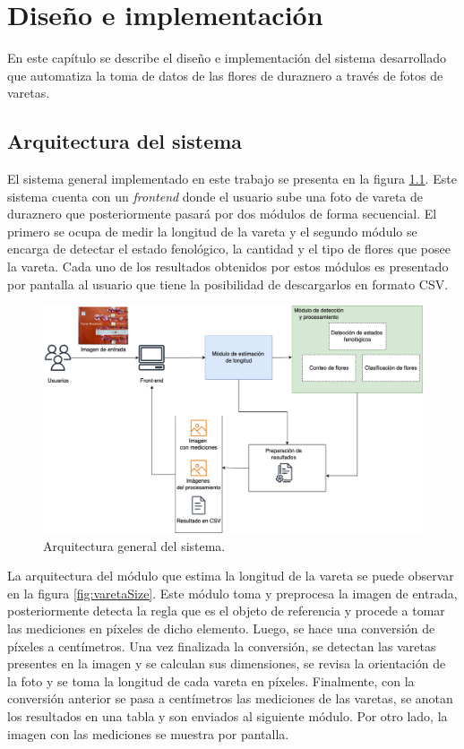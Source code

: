 \chapter{Diseño e implementación} %

\label{Chapter3} %

En este capítulo se describe el diseño e implementación del sistema desarrollado que automatiza la toma de datos de las flores de duraznero a través de fotos de varetas.

\section{Arquitectura del sistema}
\label{section3.1}

El sistema general implementado en este trabajo se presenta en la figura \ref{fig:sistemaGeneral}. Este sistema cuenta con un \textit{frontend} donde el usuario sube una foto de vareta de duraznero que posteriormente pasará por dos módulos de forma secuencial. El primero se ocupa de medir la longitud de la vareta y el segundo módulo se encarga de detectar el estado fenológico, la cantidad y el tipo de flores que posee la vareta. Cada uno de los resultados obtenidos por estos módulos es presentado por pantalla al usuario que tiene la posibilidad de descargarlos en formato CSV.

\begin{figure}[ht]
	\centering
	\includegraphics[scale=.35]{./Figures/arq1.drawio.png}
	\caption{Arquitectura general del sistema.}
	\label{fig:sistemaGeneral}
\end{figure}

La arquitectura del módulo que estima la longitud de la vareta se puede observar en la figura \ref{fig:varetaSize}. Este módulo toma y preprocesa la imagen de entrada, posteriormente detecta la regla que es el objeto de referencia y procede a tomar las mediciones en píxeles de dicho elemento. Luego, se hace una conversión de píxeles a centímetros. Una vez finalizada la conversión, se detectan las varetas presentes en la imagen y se calculan sus dimensiones, se revisa la orientación de la foto y se toma la longitud de cada vareta en píxeles. Finalmente, con la conversión anterior se pasa a centímetros las mediciones de las varetas, se anotan los resultados en una tabla y son enviados al siguiente módulo. Por otro lado, la imagen con las mediciones se muestra por pantalla.

